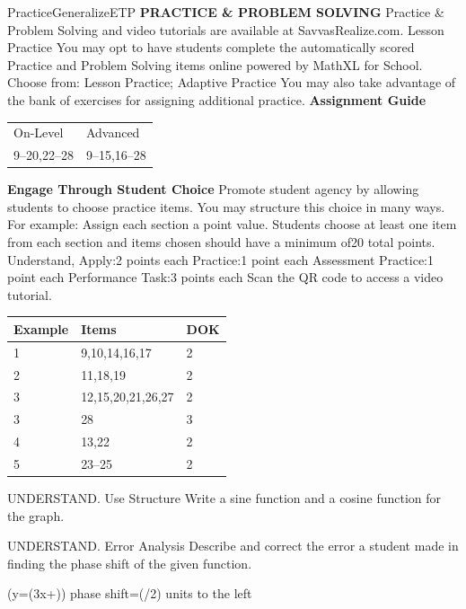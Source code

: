 \documentclass{article}
\newenvironment{item-analysis}{}{}      %
\newenvironment{practice}[2]{}{}        %
\newenvironment{te-addendum}[2]{}{}     %
\newcommand{\answer}[1]{}               %
\newcommand{\placeholder}[2]{}          %
\newcommand{\te}[1]{}                   %
\begin{document}
\begin{te-addendum}{Practice}{GeneralizeETP}
\textbf{PRACTICE \& PROBLEM SOLVING}
Practice \& Problem Solving and video tutorials are available at SavvasRealize.com.
Lesson Practice You may opt to have students complete the automatically scored Practice and Problem Solving items online powered by MathXL for School.
Choose from: Lesson Practice; Adaptive Practice
You may also take advantage of the bank of exercises for assigning additional practice.
\textbf{Assignment Guide}
\begin{tabular}{ll}
On-Level & Advanced \\
9--20,22--28 & 9--15,16--28 \\
\end{tabular}
\textbf{Engage Through Student Choice}
Promote student agency by allowing students to choose practice items. You may structure this choice in many ways. For example:
Assign each section a point value. Students choose at least one item from each section and items chosen should have a minimum of20 total points.
Understand, Apply:2 points each
Practice:1 point each
Assessment Practice:1 point each
Performance Task:3 points each
Scan the QR code to access a video tutorial.
\end{te-addendum}
\begin{item-analysis}
\begin{tabular}{lll}
\toprule
Example & Items & DOK \\
\midrule
1 & 9,10,14,16,17 & 2 \\
2 & 11,18,19 & 2 \\
3 & 12,15,20,21,26,27 & 2 \\
3 & 28 & 3 \\
4 & 13,22 & 2 \\
5 & 23--25 & 2 \\
\bottomrule
\end{tabular}
\end{item-analysis}
\begin{practice}{9}{2}
UNDERSTAND. Use Structure Write a sine function and a cosine function for the graph.
\placeholder{graph}{Red sinusoid on grid,arrowed x,y axes,O; x ticks pi/4 labels-2pi,-pi,pi,2pi; y ticks1/4 labels-1,1;window-9pi/4..9pi/4,-5/4..5/4. Marked points(-pi/6,1),(pi/3,0),(5pi/6,-1), red labels;period2pi,end arrows.}
\answer{(y=\sin(x+\frac{2\pi}3)) and (y=\cos(x+\frac\pi6))}
\end{practice}
\begin{practice}{10}{2}
UNDERSTAND. Error Analysis Describe and correct the error a student made in finding the phase shift of the given function.
\te{Student work marked with redX:}
(y=\cos(3x+\frac{}))
phase shift=(\pi/2) units to the left
\answer{The student did not first factor out a3. The phase shift is left(pi/6) units.}
\end{practice}
\end{document}
